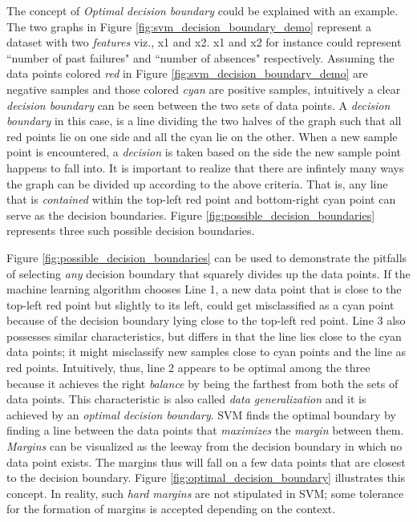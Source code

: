 \documentclass{article}
\begin{document}
	The concept of \emph{Optimal decision boundary} could be explained with an example. The two graphs in Figure \ref{fig:svm_decision_boundary_demo} represent a dataset with two \emph{features} viz., x1 and x2. x1 and x2 for instance could represent ``number of past failures" and ``number of absences" respectively. Assuming the data points colored \emph{red} in Figure \ref{fig:svm_decision_boundary_demo} are negative samples and those colored \emph{cyan} are positive samples, intuitively a clear \emph{decision boundary} can be seen between the two sets of data points. A \emph{decision boundary} in this case, is a line dividing the two halves of the graph such that all red points lie on one side and all the cyan lie on the other. When a new sample point is encountered, a \emph{decision} is taken based on the side the new sample point happens to fall into. It is important to realize that there are infintely many ways the graph can be divided up according to the above criteria. That is, any line that is \emph{contained} within the top-left red point and bottom-right cyan point can serve as the decision boundaries. Figure \ref{fig:possible_decision_boundaries} represents three such possible decision boundaries. 
	
	Figure \ref{fig:possible_decision_boundaries} can be used to demonstrate the pitfalls of selecting \emph{any} decision boundary that squarely divides up the data points. If the machine learning algorithm chooses Line 1, a new data point that is close to the top-left red point but slightly to its left, could get misclassified as a cyan point because of the decision boundary lying close to the top-left red point. Line 3 also possesses similar characteristics, but differs in that the line lies close to the cyan data points; it might misclassify new samples close to cyan points and the line as red points. Intuitively, thus, line 2 appears to be optimal among the three because it achieves the right \emph{balance} by being the farthest from both the sets of data points. This characteristic is also called \emph{data generalization} and it is achieved by an \emph{optimal decision boundary}. SVM finds the optimal boundary by finding a line between the data points that \emph{maximizes} the \emph{margin} between them. \emph{Margins} can be visualized as the leeway from the decision boundary in which no data point exists. The margins thus will fall on a few data points that are closest to the decision boundary. Figure \ref{fig:optimal_decision_boundary} illustrates this concept. In reality, such \emph{hard margins} are not stipulated in SVM; some tolerance for the formation of margins is accepted depending on the context.
	
\end{document}
